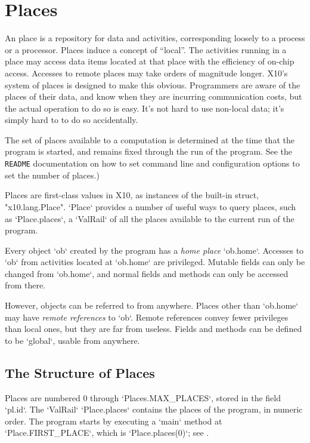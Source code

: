 \chapter{Places}\label{XtenPlaces}

An \Xten{} place is a repository for data and activities, corresponding
loosely to a process or a processor. Places induce a concept of ``local''. The
activities running in a place may access data items located at that place with
the efficiency of on-chip access. Accesses to remote places may take orders of
magnitude longer. X10's system of places is designed to make this obvious.
Programmers are aware of the places of their data, and know when they are
incurring communication costs, but the actual operation to do so is easy. It's
not hard to use non-local data; it's simply hard to to do so accidentally.

The set of places available to a computation is determined at the time that
the program is started, and remains fixed through the run of the program. See
the {\tt README} documentation on how to set command line and configuration
options to set the number of places.)

Places are first-class values in X10, as instances of the built-in struct,
\xcd"x10.lang.Place".   \xcd`Place` provides a number of useful ways to
query places, such as \xcd`Place.places`, a \xcd`ValRail` of all the places
available to the current run of the program.

Every object \xcd`ob` created by the program has a {\em home place}
\xcd`ob.home`. Accesses to \xcd`ob` from activities located at \xcd`ob.home`
are privileged.  Mutable fields can only be changed from \xcd`ob.home`, and
normal fields and methods can only be accessed from there. 

However, objects can be referred to from anywhere.  Places other than
\xcd`ob.home` may have {\em remote references} to \xcd`ob`.  Remote references
convey fewer privileges than local ones, but they are far from useless.
Fields and methods can be defined to be \xcd`global`, usable from anywhere. 


\section{The Structure of Places}

Places are numbered 0 through \xcd`Places.MAX_PLACES`, stored in the field
\xcd`pl.id`.  The \xcd`ValRail` \xcd`Place.places` contains the places of the
program, in numeric order. 
The program starts by executing a \xcd`main` method at
\xcd`Place.FIRST_PLACE`, which is \xcd`Place.places(0)`; see
. 

